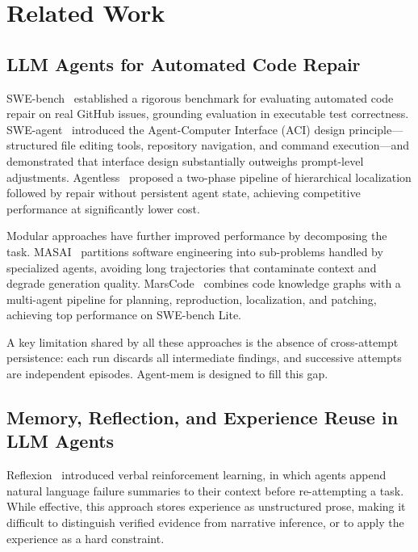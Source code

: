 \documentclass{article}
\begin{document}
\section{Related Work}

\subsection{LLM Agents for Automated Code Repair}

SWE-bench~\cite{jimenez2024swebench} established a rigorous benchmark for evaluating automated code repair on real GitHub issues, grounding evaluation in executable test correctness. SWE-agent~\cite{yang2024sweagent} introduced the Agent-Computer Interface (ACI) design principle---structured file editing tools, repository navigation, and command execution---and demonstrated that interface design substantially outweighs prompt-level adjustments. Agentless~\cite{xia2024agentless} proposed a two-phase pipeline of hierarchical localization followed by repair without persistent agent state, achieving competitive performance at significantly lower cost.

Modular approaches have further improved performance by decomposing the task. MASAI~\cite{arora2024masai} partitions software engineering into sub-problems handled by specialized agents, avoiding long trajectories that contaminate context and degrade generation quality. MarsCode~\cite{zan2024marscode} combines code knowledge graphs with a multi-agent pipeline for planning, reproduction, localization, and patching, achieving top performance on SWE-bench Lite.

A key limitation shared by all these approaches is the absence of cross-attempt persistence: each run discards all intermediate findings, and successive attempts are independent episodes. Agent-mem is designed to fill this gap.

\subsection{Memory, Reflection, and Experience Reuse in LLM Agents}

Reflexion~\cite{shinn2023reflexion} introduced verbal reinforcement learning, in which agents append natural language failure summaries to their context before re-attempting a task. While effective, this approach stores experience as unstructured prose, making it difficult to distinguish verified evidence from narrative inference, or to apply the experience as a hard constraint.
\end{document}
